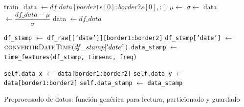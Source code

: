 \begin{algorithm}[H]
\begin{algorithmic}[1]
		
		\State train\_data $\gets df\_data[border1s[0]:border2s[0], :]$
		\State $\mu \gets$ 
		\State $\sigma \gets$ 
		\State data $\gets \dfrac{df\_data - \mu}{\sigma}$
		\Else
		\State data $\gets df\_data$
		\EndIf

		
		\State \texttt{df\_stamp} $\gets$ \texttt{df\_raw[['date']][border1:border2]}
		\State \texttt{df\_stamp['date']}  $\gets$ $\Call{convertirDateTime}{df\_stamp['date']}$
		\State \texttt{data\_stamp} $\gets$ \texttt{time\_features(df\_stamp, timeenc, freq)}
		
		
		\State \texttt{self.data\_x} $\gets$ \texttt{data[border1:border2]}
		\State \texttt{self.data\_y} $\gets$ \texttt{data[border1:border2]}
		\State \texttt{self.data\_stamp} $\gets$ \texttt{data\_stamp}
		
		\EndProcedure
	\end{algorithmic}
	\caption{Preprocesado de datos: función genérica para lectura, particionado y guardado}
	\label{preproc}
\end{algorithm}



